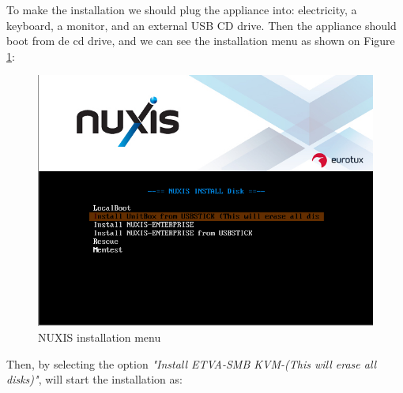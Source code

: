 To make the installation we should plug the appliance into: electricity, a keyboard, a monitor, and an external USB CD drive.
Then the appliance should boot from de cd drive, and we can see the installation menu as shown on Figure \ref{fig:boot_install_screen_standard}:

\begin{figure}[H]
	\begin{center}
	\includegraphics[scale=0.4]{screenshots/install/unitbox/bootmenu.png}
	\caption{NUXIS installation menu}
	\label{fig:boot_install_screen_standard}
	\end{center}
\end{figure}

Then, by selecting the option \emph{"Install ETVA-SMB KVM-(This will erase all disks)"}, will start the installation as:

